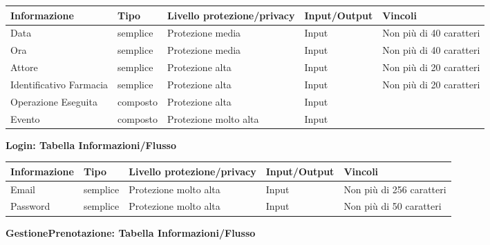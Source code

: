 \begin{tabular} {|P{3cm}|P{3cm}|P{3cm}|P{3cm}|P{3cm}|}
    \hline
    \textbf{Informazione} & \textbf{Tipo} & \textbf{Livello protezione/privacy} &  \textbf{Input/Output} & \textbf{Vincoli} \\
    \hline
    Data  & semplice & Protezione media & Input & Non più di 40 caratteri \\
    \hline
    Ora & semplice & Protezione media & Input & Non più di 40 caratteri \\
    \hline
    Attore & semplice & Protezione alta & Input & Non più di 20 caratteri \\
    \hline
    Identificativo Farmacia & semplice & Protezione alta & Input & Non più di 20 caratteri \\
    \hline
    Operazione Eseguita & composto & Protezione alta & Input & \\
    \hline
    Evento & composto & Protezione molto alta & Input &  \\
    \hline
\end{tabular}
\hfill \break

\textbf{Login: Tabella Informazioni/Flusso}
\hfill \break

\begin{tabular} {|P{3cm}|P{3cm}|P{3cm}|P{3cm}|P{3cm}|}
    \hline
    \textbf{Informazione} & \textbf{Tipo} & \textbf{Livello protezione/privacy} & \textbf{Input/Output} & \textbf{Vincoli} \\
    \hline
    Email & semplice & Protezione molto alta & Input & Non più di 256 caratteri \\
    \hline
    Password & semplice & Protezione molto alta & Input & Non più di 50 caratteri \\
    \hline
\end{tabular}
\hfill \break

\textbf{GestionePrenotazione: Tabella Informazioni/Flusso}
\hfill \break

